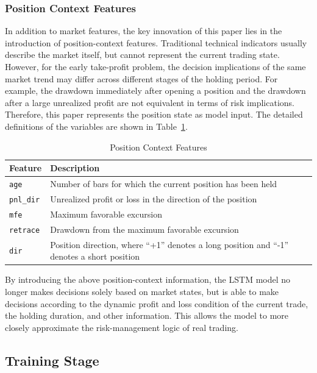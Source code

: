 \documentclass[12pt]{article}
\begin{document}
\subsubsection{Position Context Features}

In addition to market features, the key innovation of this paper lies in the introduction of 
position-context features. Traditional technical indicators usually describe the market itself, 
but cannot represent the current trading state. However, for the early take-profit problem, the 
decision implications of the same market trend may differ across different stages of the 
holding period. For example, the drawdown immediately after opening a position and the drawdown 
after a large unrealized profit are not equivalent in terms of risk implications. Therefore, 
this paper represents the position state as model input. The detailed definitions of the 
variables are shown in Table~\ref{tab:position_context_features}.

\begin{table}[H]
\centering
\caption{Position Context Features}
\label{tab:position_context_features}
\small
\renewcommand{\arraystretch}{1.2}
\begin{tabular}{p{}p{}}
\toprule
Feature & Description \\
\midrule
\texttt{age} & Number of bars for which the current position has been held \\
\texttt{pnl\_dir} & Unrealized profit or loss in the direction of the position \\
\texttt{mfe} & Maximum favorable excursion \\
\texttt{retrace} & Drawdown from the maximum favorable excursion \\
\texttt{dir} & Position direction, where ``+1'' denotes a long position and ``-1'' denotes a short position \\
\bottomrule
\end{tabular}
\end{table}

By introducing the above position-context information, the LSTM model no longer makes decisions 
solely based on market states, but is able to make decisions according to the dynamic profit 
and loss condition of the current trade, the holding duration, and other information. This 
allows the model to more closely approximate the risk-management logic of real trading.

\subsection{Training Stage}\label{subsec:training_stage}
\end{document}
